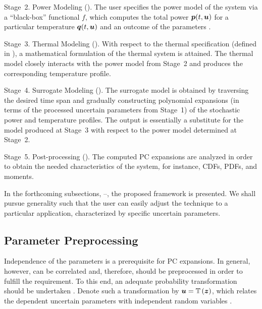 Stage~2. Power Modeling (). The user specifies the power model
of the system via a ``black-box'' functional $f$, which computes the total power
$\boldsymbol{p}(t, \boldsymbol{u})$ for a particular temperature $\boldsymbol{q}(t, \boldsymbol{u})$ and an outcome of the
parameters \vu.

Stage~3. Thermal Modeling (). With respect to the thermal
specification \spec (defined in ), a mathematical
formulation of the thermal system is attained. The thermal model closely
interacts with the power model from Stage~2 and produces the corresponding
temperature profile.

Stage~4. Surrogate Modeling (). The surrogate model is
obtained by traversing the desired time span and gradually constructing
polynomial expansions (in terms of the processed uncertain parameters \vz from
Stage~1) of the stochastic power and temperature profiles. The output is
essentially a substitute for the model produced at Stage~3 with respect to the
power model determined at Stage~2.

Stage~5. Post-processing (). The computed PC expansions
are analyzed in order to obtain the needed characteristics of the system, for
instance, CDFs, PDFs, and moments.

In the forthcoming subsections,
--, the proposed framework is
presented. We shall pursue generality such that the user can easily adjust the
technique to a particular application, characterized by specific uncertain
parameters.

\subsection{Parameter Preprocessing}

Independence of the parameters is a prerequisite for PC expansions. In general,
however, \vu can be correlated and, therefore, should be preprocessed in order
to fulfill the requirement. To this end, an adequate probability transformation
should be undertaken \cite{eldred2008}. Denote such a transformation by $\boldsymbol{u} =
\mathbb{T}\left(\boldsymbol{z}\right)$, which relates the \nu dependent uncertain parameters \vu with
\nz independent random variables \vz.

